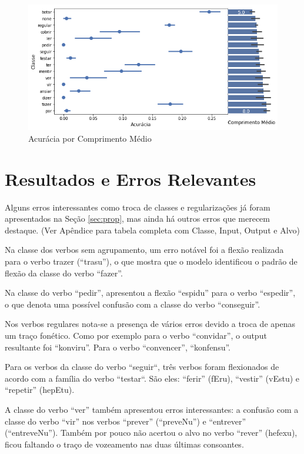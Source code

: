 \begin{figure}[H]
  \centering
  \includegraphics[width=0.8\linewidth]{img/comp_acc.png}
  \caption{Acurácia por Comprimento Médio}
  \label{fig:kfoldprop}
\end{figure}


\section{Resultados e Erros Relevantes}
\label{sec:interesting}

Alguns erros interessantes como troca de classes e regularizações já foram apresentados na Seção \ref{sec:prop}, mas ainda há outros erros que merecem destaque. (Ver Apêndice para tabela completa com Classe, Input, Output e Alvo)

Na classe dos verbos sem agrupamento, um erro notável foi a flexão realizada para o verbo trazer (“trasu”), o que mostra que o modelo identificou o padrão de flexão da classe do verbo “fazer”. 

Na classe do verbo “pedir”, apresentou a flexão “espidu” para o verbo “espedir”, o que denota uma possível confusão com a classe do verbo “conseguir”.

Nos verbos regulares nota-se a presença de vários erros devido a troca de apenas um traço fonético. Como por exemplo para o verbo “convidar”, o output resultante foi “konviru”. Para o verbo “convencer”, “konfensu”.

Para os verbos da classe do verbo “seguir“, três verbos foram flexionados de acordo com a família do verbo “testar“. São eles: “ferir” (fEru), “vestir” (vEstu) e “repetir” (hepEtu).

A classe do verbo “ver” também apresentou erros interessantes: a confusão com a classe do verbo “vir” nos verbos “prever” (“preveNu”) e “entrever” (“entreveNu”). Também por pouco não acertou o alvo no verbo “rever” (hefexu), ficou faltando o traço de vozeamento nas duas últimas consoantes.
